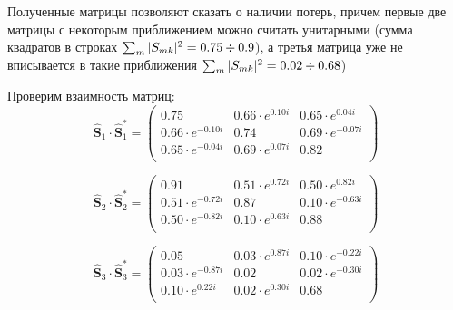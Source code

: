 \documentclass[a4paper,12pt]{article}
\newcommand\Smat{\hat { \mathbf { S } }}
\begin{document}
Полученные матрицы позволяют сказать о наличии потерь, причем первые две матрицы с некоторым приближением можно считать унитарными (сумма квадратов в строках $\sum_m|S_{mk}|^2=0.75\divisionsymbol0.9$), а третья матрица уже не вписывается в такие приближения $\sum_m|S_{mk}|^2=0.02\divisionsymbol0.68$)

Проверим взаимность матриц:
\begin{equation}
	\Smat_1\cdot\Smat^*_1=
	\begin{pmatrix}
 0.75  & 0.66\cdot e^{0.10 i} & 0.65\cdot e^{0.04 i} \\
 0.66\cdot e^{-0.10 i} & 0.74 & 0.69\cdot e^{-0.07 i} \\
 0.65\cdot e^{-0.04 i} & 0.69\cdot e^{0.07 i} & 0.82 \\
	\end{pmatrix}
\end{equation}


\begin{equation}
	\Smat_2\cdot\Smat^*_2=
	\begin{pmatrix}
 0.91 & 0.51\cdot e^{0.72 i} & 0.50\cdot e^{0.82 i} \\
 0.51\cdot e^{-0.72 i} & 0.87 & 0.10\cdot e^{-0.63 i} \\
 0.50\cdot e^{-0.82 i} & 0.10\cdot e^{0.63 i} & 0.88 \\
	\end{pmatrix}
\end{equation}

\begin{equation}
	\Smat_3\cdot\Smat^*_3=
	\begin{pmatrix}
 0.05 & 0.03\cdot e^{0.87 i} & 0.10\cdot e^{-0.22 i} \\
 0.03\cdot e^{-0.87 i} & 0.02 & 0.02\cdot e^{-0.30 i} \\
 0.10\cdot e^{0.22 i} & 0.02\cdot e^{0.30 i} & 0.68 \\
	\end{pmatrix}
\end{equation}



\end{document}
